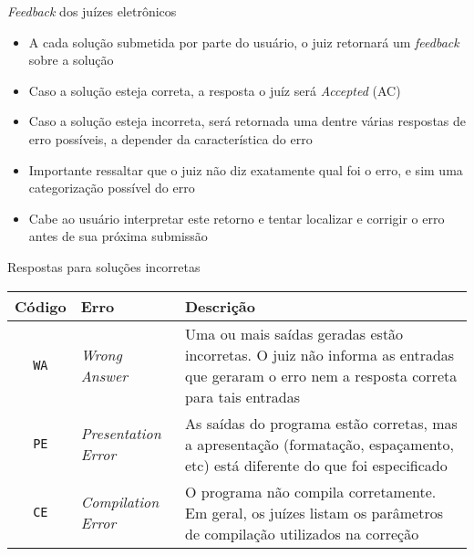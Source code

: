 \begin{frame}[fragile]{\textit{Feedback} dos juízes eletrônicos}

    \begin{itemize}
        \item A cada solução submetida por parte do usuário, o juiz retornará um \textit{feedback}
        sobre a solução
        \item Caso a solução esteja correta, a resposta o juíz será \textit{Accepted} (AC)
        \item Caso a solução esteja incorreta, será retornada uma dentre várias respostas de 
        erro possíveis, a depender da característica do erro
        \item Importante ressaltar que o juiz não diz exatamente qual foi o erro, e sim uma
        categorização possível do erro
        \item Cabe ao usuário interpretar este retorno e tentar localizar e corrigir o erro 
        antes de sua próxima submissão
    \end{itemize}

\end{frame}

\begin{frame}[fragile]{Respostas para soluções incorretas}

    \begin{center}
        \begin{tabularx}{\textwidth}{clX}
            \toprule
            \textbf{Código} & \textbf{Erro} & \textbf{Descrição} \\
            \midrule
            \texttt{WA} & \textit{Wrong Answer} & Uma ou mais saídas geradas estão incorretas. O juiz  não informa as entradas que geraram o erro nem a resposta correta para tais entradas   \\
            \midrule
            \rowcolor[gray]{0.9}
            \texttt{PE} & \textit{Presentation Error} & As saídas do programa estão corretas, mas a apresentação (formatação,  espaçamento,  etc)  está diferente do que foi especificado \\
            \midrule
            \texttt{CE} & \textit{Compilation Error} & O programa  não  compila  corretamente.
  Em geral, os juízes listam os parâmetros de compilação utilizados na correção \\
        \bottomrule
        \end{tabularx}
    \end{center}

\end{frame}


